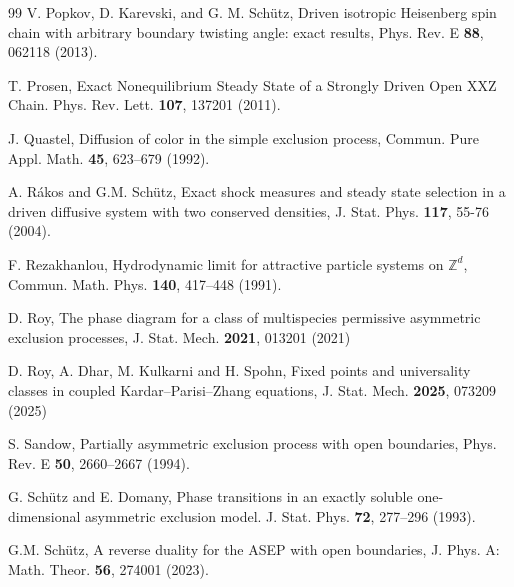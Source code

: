 \documentclass[12pt]{article}
\begin{document}
\begin{thebibliography}{99}
 V. Popkov, D. Karevski, and G. M. Schütz,  Driven isotropic Heisenberg spin chain with arbitrary boundary twisting angle: exact results,  Phys. Rev. E \textbf{88}, 062118 (2013).

%
 T. Prosen, Exact Nonequilibrium Steady State of a Strongly Driven Open XXZ Chain. Phys. Rev. Lett. \textbf{107}, 137201 (2011).

 J. Quastel, Diffusion of color in the simple exclusion process, Commun. Pure Appl. Math. \textbf{45}, 623--679 (1992).


A. R\'akos and G.M. Sch\"utz,
Exact shock measures and steady state selection in a driven
diffusive system with two conserved densities,
J. Stat. Phys. \textbf{117}, 55-76 (2004).


F. Rezakhanlou,
Hydrodynamic limit for attractive particle systems on $\mathbb Z^d$,
Commun. Math. Phys. \textbf{140}, 417--448 (1991).

D. Roy,
The phase diagram for a class of multispecies permissive asymmetric exclusion processes,
J. Stat. Mech. \textbf{2021}, 013201 (2021)

D. Roy, A. Dhar, M. Kulkarni and H. Spohn,
Fixed points and universality classes in coupled Kardar–Parisi–Zhang equations, 
J. Stat. Mech. \textbf{2025},  073209 (2025)

S. Sandow, 
Partially asymmetric exclusion process with open boundaries,
Phys. Rev. E \textbf{50}, 2660--2667 (1994). 

G. Sch\"{u}tz and E. Domany, 
Phase transitions in an exactly soluble one- dimensional asymmetric exclusion model. 
J. Stat. Phys. \textbf{72}, 277--296 (1993).

 G.M. Sch\"utz,   A reverse duality for the ASEP with open boundaries,  J. Phys. A: Math. Theor. \textbf{56}, 274001 (2023).


\end{thebibliography}
\end{document}
